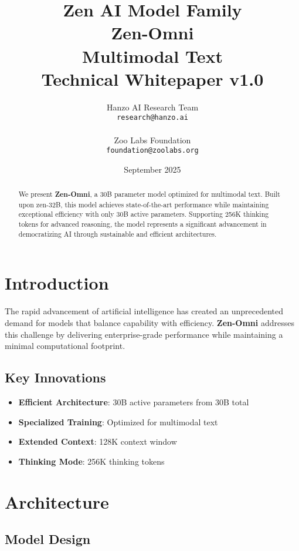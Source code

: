 \documentclass[11pt,a4paper]{article}
\title{
    \vspace{-2cm}
    \Large \textbf{Zen AI Model Family} \\
    \vspace{0.5cm}
    \Huge \textbf{Zen-Omni} \\
    \vspace{0.3cm}
    \large Multimodal Text \\
    \vspace{0.5cm}
    \normalsize Technical Whitepaper v1.0
}
\author{
    Hanzo AI Research Team \\
    \texttt{research@hanzo.ai} \\
    \\
    Zoo Labs Foundation \\
    \texttt{foundation@zoolabs.org}
}
\date{September 2025}
\begin{document}
\maketitle

\begin{abstract}
We present \textbf{Zen-Omni}, a 30B parameter model optimized for multimodal text. 
Built upon zen-32B, this model achieves state-of-the-art performance while maintaining exceptional efficiency 
with only 30B active parameters. Supporting 256K thinking tokens for advanced reasoning, the model represents a significant advancement in democratizing AI through sustainable and efficient architectures.
\end{abstract}

\tableofcontents
\newpage

\section{Introduction}

The rapid advancement of artificial intelligence has created an unprecedented demand for models that balance capability with efficiency. 
\textbf{Zen-Omni} addresses this challenge by delivering enterprise-grade performance while maintaining a minimal computational footprint.

\subsection{Key Innovations}
\begin{itemize}
    \item \textbf{Efficient Architecture}: 30B active parameters from 30B total
    \item \textbf{Specialized Training}: Optimized for multimodal text
    \item \textbf{Extended Context}: 128K context window
    \item \textbf{Thinking Mode}: 256K thinking tokens
    
    
\end{itemize}

\section{Architecture}

\subsection{Model Design}
\end{document}
